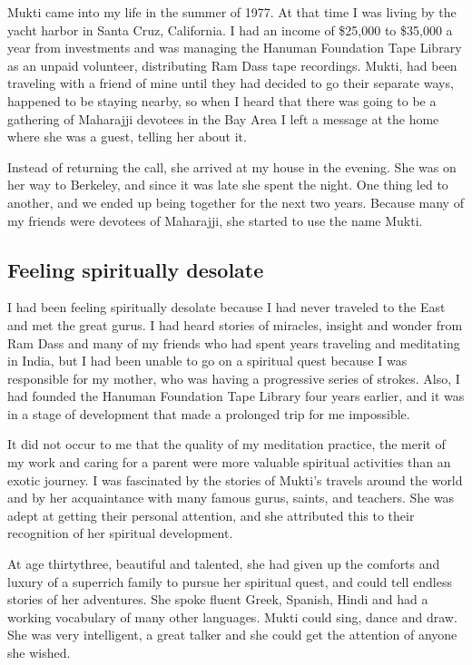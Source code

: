 \documentclass[a5paper,10pt,english]{book}
\begin{document}
\sphinxAtStartPar
Mukti came into my life in the summer of 1977. At that time I was living
by the yacht harbor in Santa Cruz, California. I had an income of
\$25,000 to \$35,000 a year from investments and was managing the Hanuman
Foundation Tape Library as an unpaid volunteer, distributing Ram Dass
tape recordings. Mukti, had been traveling with a friend of mine until
they had decided to go their separate ways, happened to be staying
nearby, so when I heard that there was going to be a gathering of
Maharajji devotees in the Bay Area I left a message at the home where
she was a guest, telling her about it.

\sphinxAtStartPar
Instead of returning the call, she arrived at my house in the evening.
She was on her way to Berkeley, and since it was late she spent the
night. One thing led to another, and we ended up being together for the
next two years. Because many of my friends were devotees of Maharajji,
she started to use the name Mukti.


\subsection{Feeling spiritually desolate}
\label{\detokenize{psychopaths:feeling-spiritually-desolate}}
\sphinxAtStartPar
I had been feeling spiritually desolate because I had never traveled to
the East and met the great gurus. I had heard stories of miracles,
insight and wonder from Ram Dass and many of my friends who had spent
years traveling and meditating in India, but I had been unable to go on
a spiritual quest because I was responsible for my mother, who was
having a progressive series of strokes. Also, I had founded the Hanuman
Foundation Tape Library four years earlier, and it was in a stage of
development that made a prolonged trip for me impossible.

\sphinxAtStartPar
It did not occur to me that the quality of my meditation practice, the
merit of my work and caring for a parent were more valuable spiritual
activities than an exotic journey. I was fascinated by the stories of
Mukti’s travels around the world and by her acquaintance with many
famous gurus, saints, and teachers. She was adept at getting their
personal attention, and she attributed this to their recognition of her
spiritual development.

\sphinxAtStartPar
At age thirty\sphinxhyphen{}three, beautiful and talented, she had given up the
comforts and luxury of a super\sphinxhyphen{}rich family to pursue her spiritual
quest, and could tell endless stories of her adventures. She spoke
fluent Greek, Spanish, Hindi and had a working vocabulary of many other
languages. Mukti could sing, dance and draw. She was very intelligent, a
great talker and she could get the attention of anyone she wished.
\end{document}
